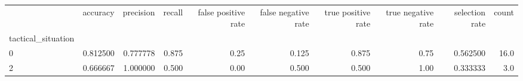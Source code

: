 \begin{tabular}{lrrrrrrrrr}
\toprule
{} &  accuracy &  precision &  recall &  false positive rate &  false negative rate &  true positive rate &  true negative rate &  selection rate &  count \\
tactical\_situation &           &            &         &                      &                      &                     &                     &                 &        \\
\midrule
0                  &  0.812500 &   0.777778 &   0.875 &                 0.25 &                0.125 &               0.875 &                0.75 &        0.562500 &   16.0 \\
2                  &  0.666667 &   1.000000 &   0.500 &                 0.00 &                0.500 &               0.500 &                1.00 &        0.333333 &    3.0 \\
\bottomrule
\end{tabular}
